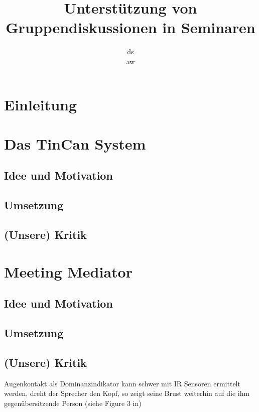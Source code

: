 \documentclass{seminarvorlage}
\begin{document}
\title{Unterstützung von Gruppendiskussionen in Seminaren}
\author{
  \alignauthor ds\\
  \alignauthor aw\\
}

\maketitle


\section{Einleitung}

\section{Das TinCan System}
\subsection{Idee und Motivation}

\subsection{Umsetzung}
\subsection{(Unsere) Kritik}

\section{Meeting Mediator}
\subsection{Idee und Motivation}
\subsection{Umsetzung}
\subsection{(Unsere) Kritik}
Augenkontakt als Dominanzindikator kann schwer mit IR Sensoren ermittelt werden,
dreht der Sprecher den Kopf, so zeigt seine Brust weiterhin auf die ihm 
gegenübersitzende Person (siehe Figure 3 in)
\end{document}
